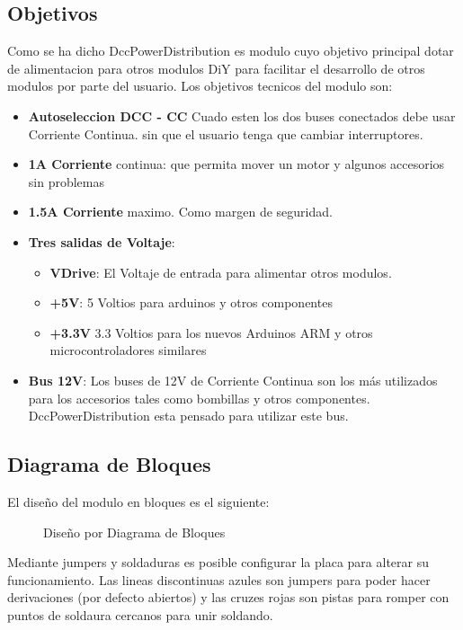 \subsection{Objetivos}
Como se ha dicho DccPowerDistribution es modulo cuyo objetivo principal dotar de alimentacion para otros modulos DiY
para facilitar el desarrollo de otros modulos por parte del usuario. Los objetivos tecnicos del modulo son:
\begin{itemize}
    \item \textbf{Autoseleccion DCC - CC} Cuado esten los dos buses conectados debe usar Corriente Continua.
sin que el usuario tenga que cambiar interruptores.    
    \item \textbf{1A Corriente} continua: que permita mover un motor y algunos accesorios
sin problemas
    \item \textbf{1.5A Corriente} maximo. Como margen de seguridad.
    \item \textbf{Tres salidas de Voltaje}:
    \begin{itemize}
        \item \textbf{VDrive}: El Voltaje de entrada para alimentar otros modulos.
        \item \textbf{+5V}: 5 Voltios para arduinos y otros componentes
        \item \textbf{+3.3V} 3.3 Voltios para los nuevos Arduinos ARM y otros microcontroladores similares
    \end{itemize}
    \item \textbf{Bus 12V}: Los buses de 12V de Corriente Continua son los más utilizados para los accesorios
tales como bombillas y otros componentes. DccPowerDistribution esta pensado para utilizar este bus.
\end{itemize}

\subsection{Diagrama de Bloques}
El diseño del modulo en bloques es el siguiente:
\begin{figure}[H]
    \centering
    
    \caption{Diseño por Diagrama de Bloques}
    \label{fig:BlockDiagrama}
\end{figure}
Mediante jumpers y soldaduras es posible configurar la placa para alterar su funcionamiento.
Las lineas discontinuas azules son jumpers para poder hacer derivaciones (por defecto abiertos) y
las cruzes rojas son pistas para romper con puntos de soldaura cercanos para unir soldando.

